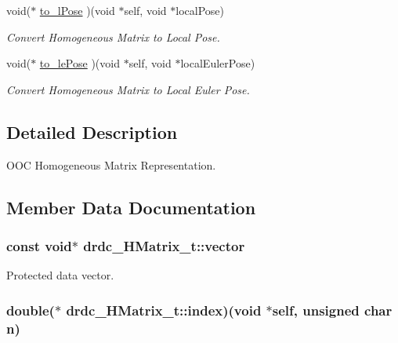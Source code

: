 \begin{CompactItemize}
void($\ast$ \hyperlink{structdrdc__HMatrix__t_7c6792ab2cdaf09ac6c1d706b0e708c1}{to\_\-lPose} )(void $\ast$self, void $\ast$localPose)
\begin{CompactList}\small\item\em Convert Homogeneous Matrix to Local Pose. \item\end{CompactList}\item 
void($\ast$ \hyperlink{structdrdc__HMatrix__t_abb29b23fa2c3c71fbbb6209984ef9af}{to\_\-lePose} )(void $\ast$self, void $\ast$localEulerPose)
\begin{CompactList}\small\item\em Convert Homogeneous Matrix to Local Euler Pose. \item\end{CompactList}\end{CompactItemize}


\subsection{Detailed Description}
OOC Homogeneous Matrix Representation. 



\subsection{Member Data Documentation}
\hypertarget{structdrdc__HMatrix__t_aec735496db11c4c267fbb03f5942a28}{
\subsubsection[vector]{\setlength{\rightskip}{0pt plus 5cm}const void$\ast$ {\bf drdc\_\-HMatrix\_\-t::vector}}}
\label{structdrdc__HMatrix__t_aec735496db11c4c267fbb03f5942a28}


Protected data vector. 

\hypertarget{structdrdc__HMatrix__t_bbd23dbb134b5f1b054d8400a2dc94b2}{
\subsubsection[index]{\setlength{\rightskip}{0pt plus 5cm}double($\ast$ {\bf drdc\_\-HMatrix\_\-t::index})(void $\ast$self, unsigned char n)}}
\label{structdrdc__HMatrix__t_bbd23dbb134b5f1b054d8400a2dc94b2}


